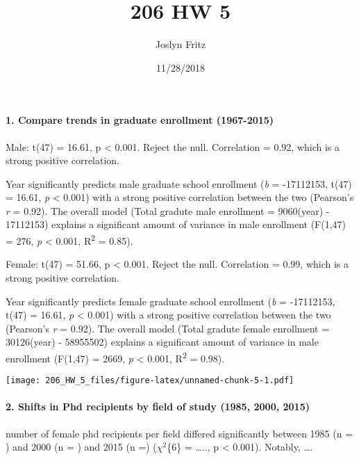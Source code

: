 \documentclass[]{article}
\title{206 HW 5}
\author{Joslyn Fritz}
\date{11/28/2018}
\let\oldparagraph\paragraph
\renewcommand{\paragraph}[1]{\oldparagraph{#1}\mbox{}}
\begin{document}
\maketitle

\paragraph{1. Compare trends in graduate enrollment
(1967-2015)}\label{compare-trends-in-graduate-enrollment-1967-2015}

Male: t(47) = 16.61, p \textless{} 0.001. Reject the null. Correlation =
0.92, which is a strong positive correlation.

Year significantly predicts male graduate school enrollment (\emph{b} =
-17112153, t(47) = 16.61, \emph{p} \textless{} 0.001) with a strong
positive correlation between the two (Pearson's \emph{r} = 0.92). The
overall model (Total gradute male enrollment = 9060(year) - 17112153)
explains a significant amount of variance in male enrollment (F(1,47) =
276, \emph{p} \textless{} 0.001, R\textsuperscript{2} = 0.85).

Female: t(47) = 51.66, p \textless{} 0.001. Reject the null. Correlation
= 0.99, which is a strong positive correlation.

Year significantly predicts female graduate school enrollment (\emph{b}
= -17112153, t(47) = 16.61, \emph{p} \textless{} 0.001) with a strong
positive correlation between the two (Pearson's \emph{r} = 0.92). The
overall model (Total gradute female enrollment = 30126(year) - 58955502)
explains a significant amount of variance in male enrollment (F(1,47) =
2669, \emph{p} \textless{} 0.001, R\textsuperscript{2} = 0.98).

\texttt{[image: 206\_HW\_5\_files/figure-latex/unnamed-chunk-5-1.pdf]}

\paragraph{2. Shifts in Phd recipients by field of study (1985, 2000,
2015)}\label{shifts-in-phd-recipients-by-field-of-study-1985-2000-2015}

number of female phd recipients per field differed significantly between
1985 (n = ) and 2000 (n = ) and 2015 (n =) (\(\chi^2\)\{6\} =
\ldots{}.., p \textless{} 0.001). Notably, \ldots{}.
\end{document}

